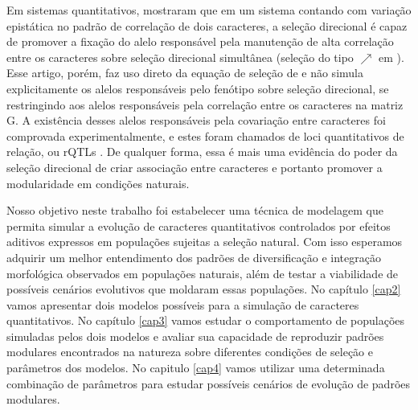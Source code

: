 Em sistemas quantitativos, \cite{Pavlicev2010} mostraram que em um
sistema contando com variação epistática no padrão de correlação de dois
caracteres, a seleção direcional é capaz de promover a fixação do alelo
responsável pela manutenção de alta correlação entre os caracteres sobre
seleção direcional simultânea  (seleção do tipo $\nearrow$ em
\cite{Jones2004}).
Esse artigo, porém, faz uso direto da equação de seleção de
\cite{Lande1979} e não simula explicitamente os alelos responsáveis pelo
fenótipo sobre seleção direcional, se restringindo aos alelos
responsáveis pela correlação entre os caracteres na matriz G.
A existência desses alelos responsáveis pela covariação entre caracteres foi
comprovada experimentalmente, e estes foram chamados de loci
quantitativos de relação, ou rQTLs \citep{Pavlicev2008a}.
De qualquer forma, essa é mais uma evidência do poder da seleção
direcional de criar associação entre caracteres e portanto promover a
modularidade em condições naturais.

Nosso objetivo neste trabalho foi estabelecer uma técnica de modelagem
que permita simular a evolução de caracteres quantitativos controlados
por efeitos aditivos expressos em populações sujeitas a seleção natural.
Com isso esperamos adquirir um melhor entendimento dos padrões de
diversificação e integração morfológica observados em populações
naturais, além de testar a viabilidade de possíveis cenários
evolutivos que moldaram essas populações.
No capítulo \ref{cap2} vamos apresentar dois modelos possíveis para a
simulação de caracteres quantitativos.
No capítulo \ref{cap3} vamos estudar o comportamento de populações
simuladas pelos dois modelos e avaliar sua capacidade de reproduzir
padrões modulares encontrados na natureza sobre diferentes condições de
seleção e parâmetros dos modelos.
No capitulo \ref{cap4} vamos utilizar uma determinada combinação de
parâmetros para estudar possíveis cenários de evolução de padrões
modulares.
